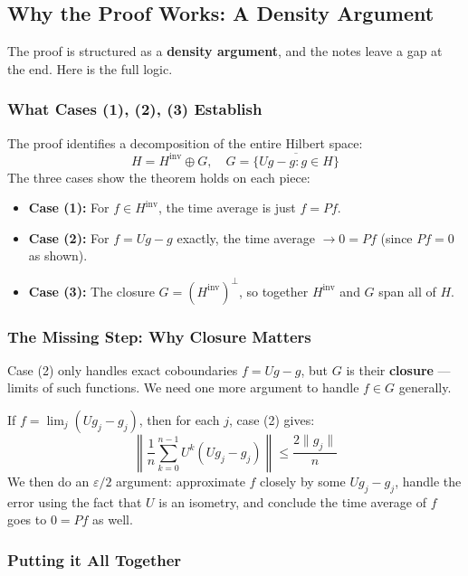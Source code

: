 \documentclass{article}
\begin{document}
\begin{mdframed}
\subsection*{Why the Proof Works: A Density Argument}

The proof is structured as a \textbf{density argument}, and the notes leave a gap at the end. 
Here is the full logic.

\subsubsection*{What Cases (1), (2), (3) Establish}

The proof identifies a decomposition of the entire Hilbert space:
\[
H = H^{\text{inv}} \oplus G, \quad G = \overline{\{Ug - g : g \in H\}}
\]
The three cases show the theorem holds on each piece:
\begin{itemize}
    \item \textbf{Case (1):} For $f \in H^{\text{inv}}$, the time average is just $f = Pf$. \checkmark
    \item \textbf{Case (2):} For $f = Ug - g$ exactly, the time average $\to 0 = Pf$ (since $Pf = 0$ as shown). \checkmark
    \item \textbf{Case (3):} The closure $G = (H^{\text{inv}})^\perp$, so together $H^{\text{inv}}$ and $G$ span all of $H$.
\end{itemize}

\subsubsection*{The Missing Step: Why Closure Matters}

Case (2) only handles exact coboundaries $f = Ug - g$, but $G$ is their \textbf{closure} --- limits 
of such functions. We need one more argument to handle $f \in G$ generally.

If $f = \lim_{j}(Ug_j - g_j)$, then for each $j$, case (2) gives:
\[
\left\| \frac{1}{n} \sum_{k=0}^{n-1} U^k(Ug_j - g_j) \right\| \leq \frac{2\|g_j\|}{n}
\]
We then do an $\varepsilon/2$ argument: approximate $f$ closely by some $Ug_j - g_j$, handle 
the error using the fact that $U$ is an isometry, and conclude the time average of $f$ 
goes to $0 = Pf$ as well.

\subsubsection*{Putting it All Together}


\end{mdframed}
\end{document}
